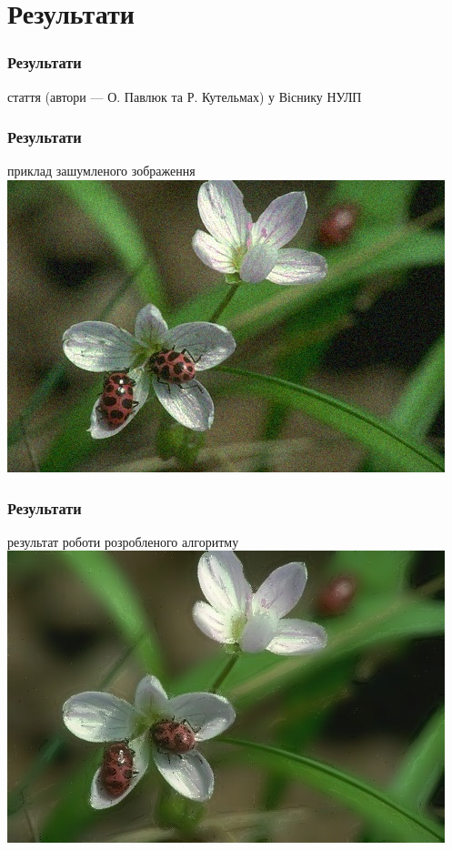 \documentclass[12pt]{beamer}
\begin{document}
\section{Результати}
\begin{frame}\frametitle{ Результати }
стаття \newline \newline   (автори — О. Павлюк та Р. Кутельмах) \newline \newline  
у Віснику НУЛП 	
\end{frame}
\begin{frame}\frametitle{ Результати}
	приклад зашумленого зображення
	\includegraphics[scale=0.5]{images/noisy_1}
\end{frame}
\begin{frame}\frametitle{ Результати}
	результат роботи розробленого алгоритму
	\includegraphics[scale=0.5]{images/my_1}
\end{frame}
\end{document}
